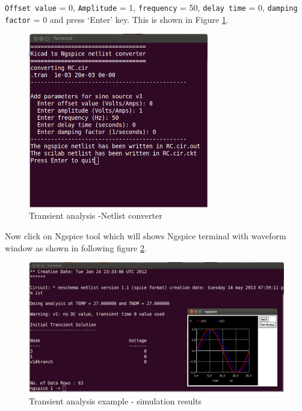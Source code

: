 {\tt Offset value} = 0, {\tt Amplitude} = 1, {\tt frequency} = 50, {\tt delay time} = 0, {\tt damping factor} = 0 and press `Enter' key.  This is shown in Figure \ref{19}.
\begin{figure}[t]
\centering
\includegraphics[width=0.7\textwidth]{figures/19}
\caption{Transient analysis -Netlist converter}
\label{19}
\end{figure}
Now click on Ngspice tool which will shows Ngspice terminal with waveform window as shown in following figure \ref{20}.
\begin{figure}[t]
\centering
\includegraphics[width=\textwidth]{figures/20}
\caption{Transient analysis example - simulation results}
\label{20}
\end{figure}
